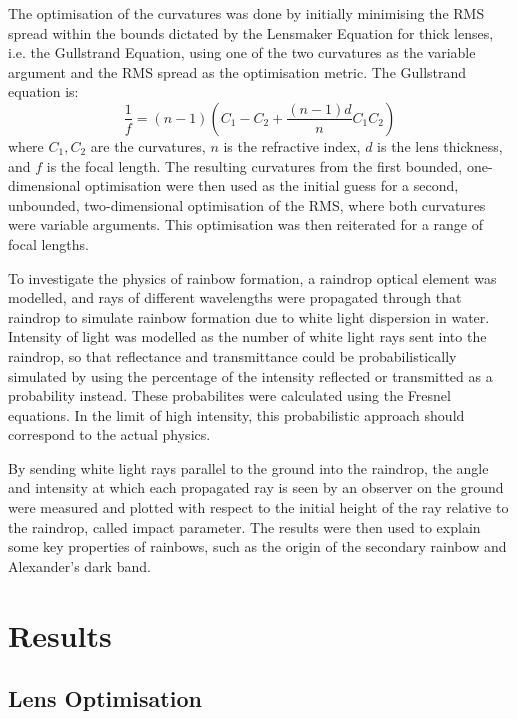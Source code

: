 \documentclass{article}
\begin{document}
The optimisation of the curvatures was done by initially minimising the RMS spread within the bounds dictated by the Lensmaker Equation for thick lenses, i.e. the Gullstrand Equation\cite{lensmaker}, using one of the two curvatures as the variable argument and the RMS spread as the optimisation metric. The Gullstrand equation is:
\begin{equation}\label{eq:lensmaker}
\frac{1}{f} = (n-1)(C_1 - C_2 + \frac{(n-1)d}{n} C_1 C_2)
\end{equation}
where $C_1,C_2$ are the curvatures, $n$ is the refractive index, $d$ is the lens thickness, and $f$ is the focal length. The resulting curvatures from the first bounded, one-dimensional optimisation were then used as the initial guess for a second, unbounded, two-dimensional optimisation of the RMS, where both curvatures were variable arguments. This optimisation was then reiterated for a range of focal lengths. 

To investigate the physics of rainbow formation, a raindrop optical element was modelled, and rays of different wavelengths were propagated through that raindrop to simulate rainbow formation due to white light dispersion in water. Intensity of light was modelled as the number of white light rays sent into the raindrop, so that reflectance and transmittance could be probabilistically simulated by using the percentage of the intensity reflected or transmitted as a probability instead. These probabilites were calculated using the Fresnel equations\cite{fresnel}. In the limit of high intensity, this probabilistic approach should correspond to the actual physics.

By sending white light rays parallel to the ground into the raindrop, the angle and intensity at which each propagated ray is seen by an observer on the ground were measured and plotted with respect to the initial height of the ray relative to the raindrop, called impact parameter\cite{impact}. The results were then used to explain some key properties of rainbows, such as the origin of the secondary rainbow and Alexander's dark band.



\section{Results}
\subsection{Lens Optimisation}
\end{document}
